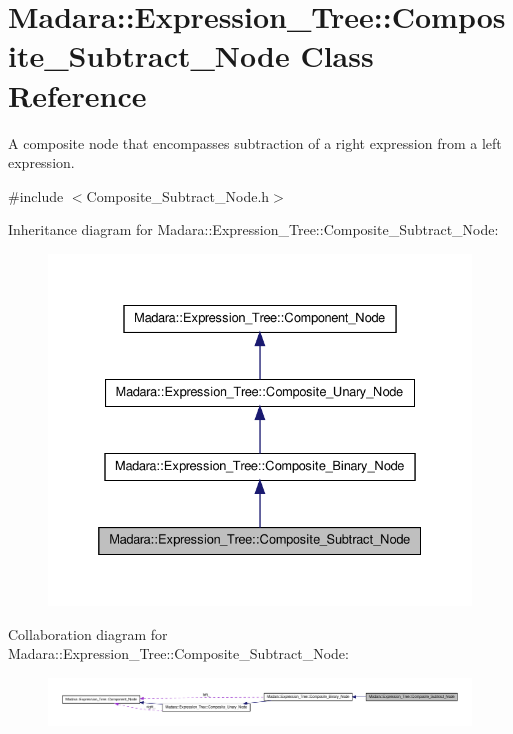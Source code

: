 \hypertarget{classMadara_1_1Expression__Tree_1_1Composite__Subtract__Node}{
\section{Madara::Expression\_\-Tree::Composite\_\-Subtract\_\-Node Class Reference}
\label{d8/d0d/classMadara_1_1Expression__Tree_1_1Composite__Subtract__Node}
}


A composite node that encompasses subtraction of a right expression from a left expression.  




{\ttfamily \#include $<$Composite\_\-Subtract\_\-Node.h$>$}



Inheritance diagram for Madara::Expression\_\-Tree::Composite\_\-Subtract\_\-Node:
\nopagebreak
\begin{figure}[H]
\begin{center}
\leavevmode
\includegraphics[width=332pt]{dc/d3f/classMadara_1_1Expression__Tree_1_1Composite__Subtract__Node__inherit__graph}
\end{center}
\end{figure}


Collaboration diagram for Madara::Expression\_\-Tree::Composite\_\-Subtract\_\-Node:
\nopagebreak
\begin{figure}[H]
\begin{center}
\leavevmode
\includegraphics[width=400pt]{d2/d35/classMadara_1_1Expression__Tree_1_1Composite__Subtract__Node__coll__graph}
\end{center}
\end{figure}
